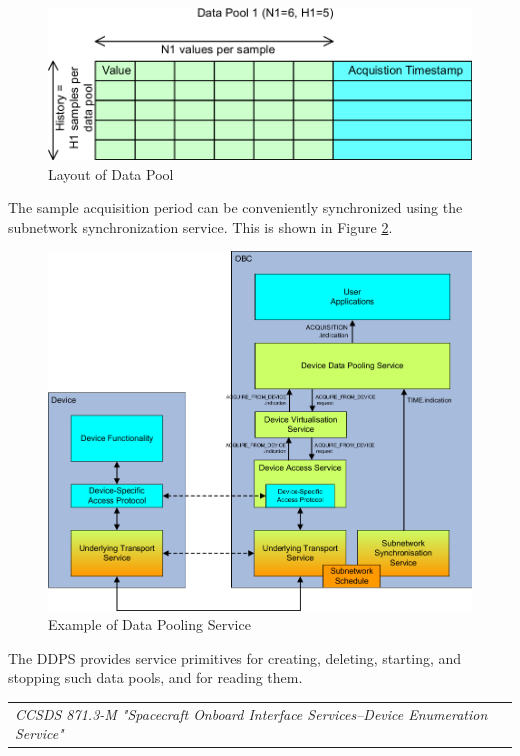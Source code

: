 \begin{figure}[h]
\centering\includegraphics[scale=0.3]{fig/layout_of_data_pool}
\caption{Layout of Data Pool}
\label{fig:Layout of Data Pool}
\end{figure}

The sample acquisition period can be conveniently synchronized using the subnetwork synchronization service. This is shown in Figure \ref{fig:Example of Data Pooling Service}.

\begin{figure}[h]
\centering\includegraphics[scale=0.3]{fig/example_of_data_pooling_service}
\caption{Example of Data Pooling Service}
\label{fig:Example of Data Pooling Service}
\end{figure}

The DDPS provides service primitives for creating, deleting, starting, and stopping such data pools, and for reading them.

\begin{tabular}{l}
\textit{CCSDS 871.3-M "Spacecraft Onboard Interface Services--Device Enumeration Service" \cite{}} 
\end{tabular}


